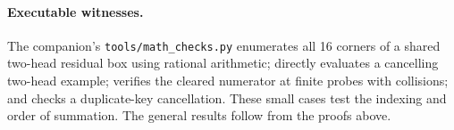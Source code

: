 \paragraph{Executable witnesses.}
The companion's \texttt{tools/math\_checks.py} enumerates all 16 corners of a shared two-head residual box using rational arithmetic; directly evaluates a cancelling two-head example; verifies the cleared numerator at finite probes with collisions; and checks a duplicate-key cancellation. These small cases test the indexing and order of summation. The general results follow from the proofs above.

